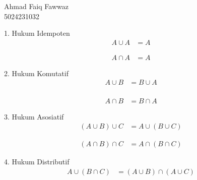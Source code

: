 \documentclass{article}
\begin{document}
\begin{justify}
    Ahmad Faiq Fawwaz\\5024231032\\
    \end{justify} 

1. Hukum Idempoten
\begin{align*}
A \cup A &= A 
\end{align*}
\begin{figure}[H]
    \centering
\end{figure} 

\begin{align*}
    A \cap A &= A
\end{align*}

\begin{figure}[H]
    \centering
\end{figure} 

2. Hukum Komutatif
\begin{align*}
A \cup B &= B \cup A\\
\end{align*}
\begin{figure}[H]
    \centering
\end{figure} 

\begin{align*}
  A \cap B &= B \cap A  
\end{align*}
\begin{figure}[H]
    \centering
\end{figure} 



3. Hukum Asosiatif
\begin{align*}
(A \cup B) \cup C &= A \cup (B \cup C) 
\end{align*}
\begin{figure}[H]
    \centering
\end{figure} 
\begin{align*}
(A \cap B) \cap C &= A \cap (B \cap C)
\end{align*}
\begin{figure}[H]
    \centering
\end{figure} 

4. Hukum Distributif
\begin{align*}
A \cup (B \cap C) &= (A \cup B) \cap (A \cup C) 
\end{align*}

\begin{figure}[H]
    \centering
\end{figure} 
\end{document}
